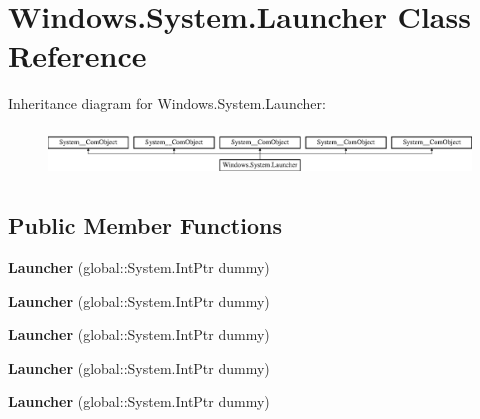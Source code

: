 \hypertarget{class_windows_1_1_system_1_1_launcher}{}\section{Windows.\+System.\+Launcher Class Reference}
\label{class_windows_1_1_system_1_1_launcher}
Inheritance diagram for Windows.\+System.\+Launcher\+:\begin{figure}[H]
\begin{center}
\leavevmode
\includegraphics[height=1.302326cm]{class_windows_1_1_system_1_1_launcher}
\end{center}
\end{figure}
\subsection*{Public Member Functions}
\begin{DoxyCompactItemize}
\item 
\mbox{\label{class_windows_1_1_system_1_1_launcher_a32a5881302f446af127b22449eb12e4f}} 
{\bfseries Launcher} (global\+::\+System.\+Int\+Ptr dummy)
\item 
\mbox{\label{class_windows_1_1_system_1_1_launcher_a32a5881302f446af127b22449eb12e4f}} 
{\bfseries Launcher} (global\+::\+System.\+Int\+Ptr dummy)
\item 
\mbox{\label{class_windows_1_1_system_1_1_launcher_a32a5881302f446af127b22449eb12e4f}} 
{\bfseries Launcher} (global\+::\+System.\+Int\+Ptr dummy)
\item 
\mbox{\label{class_windows_1_1_system_1_1_launcher_a32a5881302f446af127b22449eb12e4f}} 
{\bfseries Launcher} (global\+::\+System.\+Int\+Ptr dummy)
\item 
\mbox{\label{class_windows_1_1_system_1_1_launcher_a32a5881302f446af127b22449eb12e4f}} 
{\bfseries Launcher} (global\+::\+System.\+Int\+Ptr dummy)
\end{DoxyCompactItemize}
